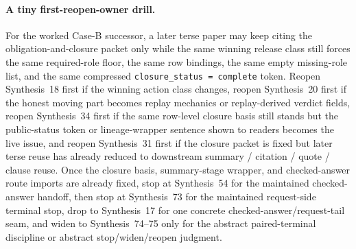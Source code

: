\documentclass[11pt]{article}
\begin{document}
\paragraph{A tiny first-reopen-owner drill.}
For the worked Case-B successor, a later terse paper may keep citing the obligation-and-closure packet only while the same winning release class still forces the same required-role floor, the same row bindings, the same empty missing-role list, and the same compressed \texttt{closure\_status = complete} token. Reopen Synthesis~18 first if the winning action class changes, reopen Synthesis~20 first if the honest moving part becomes replay mechanics or replay-derived verdict fields, reopen Synthesis~34 first if the same row-level closure basis still stands but the public-status token or lineage-wrapper sentence shown to readers becomes the live issue, and reopen Synthesis~31 first if the closure packet is fixed but later terse reuse has already reduced to downstream summary / citation / quote / clause reuse. Once the closure basis, summary-stage wrapper, and checked-answer route imports are already fixed, stop at Synthesis~54 for the maintained checked-answer handoff, then stop at Synthesis~73 for the maintained request-side terminal stop, drop to Synthesis~17 for one concrete checked-answer/request-tail seam, and widen to Synthesis~74--75 only for the abstract paired-terminal discipline or abstract stop/widen/reopen judgment.\cite{series:workedexample,series:planstateequiv,series:auditorreplay,series:statusenvelopes,series:downstreamnormalforms,series:challengeanswerreviewmenus,series:pairedterminalcitationdiscipline,series:pairedterminalcutoverrules}
\end{document}
